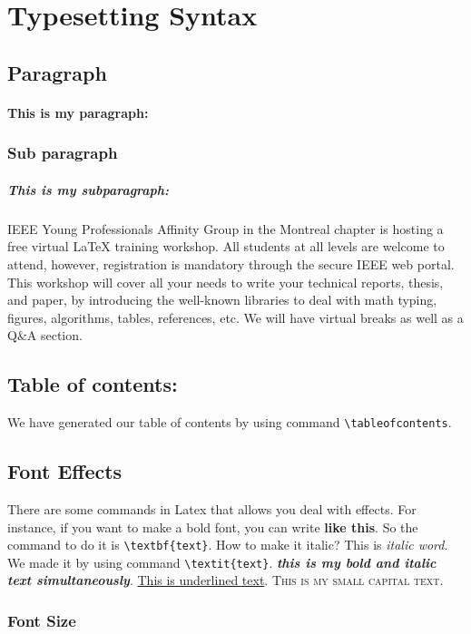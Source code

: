 \section{Typesetting Syntax} 
\label{sec:typesetting_syntax}


\subsection{Paragraph}
\label{subsec:paragraph}

\paragraph{This is my paragraph:} \lipsum[1]

\subsubsection{Sub paragraph}
\subparagraph{This is my subparagraph:} IEEE Young Professionals Affinity Group in the Montreal chapter is hosting a free virtual LaTeX training workshop. All students at all levels are welcome to attend, however, registration is mandatory through the secure IEEE web portal. This workshop will cover all your needs to write your technical reports, thesis, and paper, by introducing the well-known libraries to deal with math typing, figures, algorithms, tables, references, etc. We will have virtual breaks as well as a Q\&A section. 


\subsection{Table of contents:} We have generated our table of contents by using command  \verb|\tableofcontents|. 


\subsection{Font Effects}
There are some commands in Latex that allows you deal with effects. For instance, if you want to make a bold font, you can write \textbf{like this}. So the command to do it is \verb|\textbf{text}|. How to make it italic? This is \textit{italic word}. We made it by using command \verb|\textit{text}|. \textit{\textbf{this is my bold and italic text simultaneously}}.  \underline{This is underlined text}. \textsc{This is my small capital text}. 

\subsubsection{Font Size}

